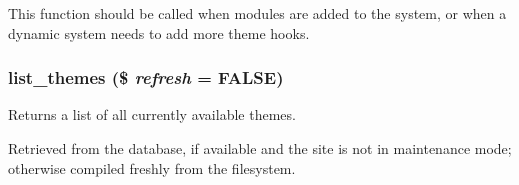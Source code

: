 This function should be called when modules are added to the system, or when a dynamic system needs to add more theme hooks. \hypertarget{includes_2theme_8inc_a48d5521b10139d745626435d804353a4}{
\subsubsection[{list\_\-themes}]{\setlength{\rightskip}{0pt plus 5cm}list\_\-themes (\$ {\em refresh} = {\ttfamily FALSE})}}
\label{includes_2theme_8inc_a48d5521b10139d745626435d804353a4}
Returns a list of all currently available themes.

Retrieved from the database, if available and the site is not in maintenance mode; otherwise compiled freshly from the filesystem.


